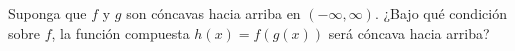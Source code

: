 \item Suponga que $f$ y $g$ son cóncavas hacia arriba en $(-\infty, \infty)$. ¿Bajo qué condición sobre $f$, la función compuesta $h(x) = f(g(x))$ será cóncava hacia arriba?

